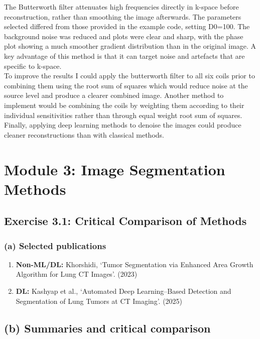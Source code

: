 \documentclass[11pt, a4paper]{article}
\begin{document}
\noindent The Butterworth filter attenuates high frequencies directly in k-space before reconstruction, rather than smoothing the image afterwards. 
The parameters selected differed from those provided in the example code, setting D0=100. 
The background noise was reduced and plots were clear and sharp, with the phase plot showing a much smoother gradient distribution than in the original image. 
A key advantage of this method is that it can target noise and artefacts that are specific to k-space.\\

\noindent To improve the results I could apply the butterworth filter to all six coils prior to combining them using the root sum of squares which would reduce noise at the source level and produce a clearer combined image. 
Another method to implement would be combining the coils by weighting them according to their individual sensitivities rather than through equal weight root sum of squares. 
Finally, applying deep learning methods to denoise the images could produce cleaner reconstructions than with classical methods.

\newpage
\section*{Module 3: Image Segmentation Methods}

\subsection*{Exercise 3.1: Critical Comparison of Methods}

\subsubsection*{(a) Selected publications}

\begin{enumerate}
    \item \textbf{Non-ML/DL:} Khorshidi, ‘Tumor Segmentation via Enhanced Area Growth Algorithm for Lung CT Images’. (2023)
    \item \textbf{DL:} Kashyap et al., ‘Automated Deep Learning–Based Detection and Segmentation of Lung Tumors at CT Imaging’. (2025)
\end{enumerate}

\subsection*{(b) Summaries and critical comparison}
\end{document}
